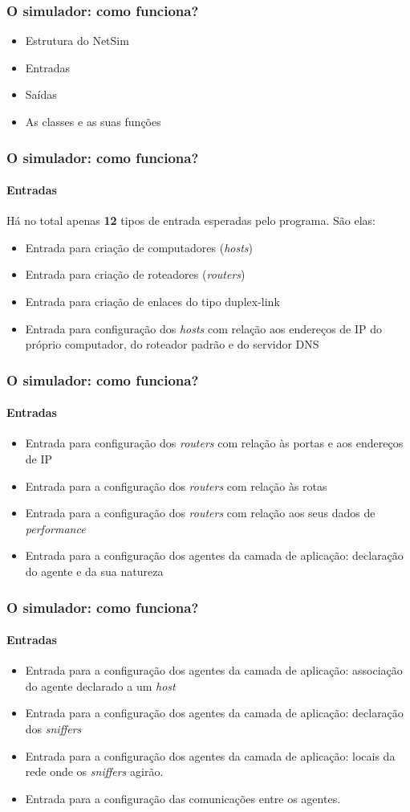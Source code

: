 \documentclass{beamer}
\begin{document}
\begin{frame}
	\frametitle{O simulador: como funciona?}
	\begin{itemize}
		\item \textcolor{covered}{Estrutura do NetSim}
		\item Entradas
		\item Saídas
		\item As classes e as suas funções
	\end{itemize}
\end{frame}

\begin{frame}
	\frametitle{O simulador: como funciona?}
	\framesubtitle{Entradas}
	Há no total apenas \textbf{12} tipos de entrada esperadas pelo programa. São elas:
	\begin{itemize}
		\item Entrada para criação de computadores (\textit{hosts})
		\item Entrada para criação de roteadores (\textit{routers})
		\item Entrada para criação de enlaces do tipo duplex-link
		\item Entrada para configuração dos \textit{hosts} com relação aos endereços de IP do próprio computador, do roteador padrão e do servidor DNS
	\end{itemize}
\end{frame}

\begin{frame}
	\frametitle{O simulador: como funciona?}
	\framesubtitle{Entradas}
	\begin{itemize}
		\item Entrada para configuração dos \textit{routers} com relação às portas e aos endereços de IP
		\item Entrada para a configuração dos \textit{routers} com relação às rotas
		\item Entrada para a configuração dos \textit{routers} com relação aos seus dados de \textit{performance}
		\item Entrada para a configuração dos agentes da camada de aplicação: declaração do agente e da sua natureza 
	\end{itemize}
\end{frame}

\begin{frame}
	\frametitle{O simulador: como funciona?}
	\framesubtitle{Entradas}
	\begin{itemize}
		\item Entrada para a configuração dos agentes da camada de aplicação: associação do agente declarado a um \textit{host}
		\item Entrada para a configuração dos agentes da camada de aplicação: declaração dos \textit{sniffers}
		\item Entrada para a configuração dos agentes da camada de aplicação: locais da rede onde os \textit{sniffers} agirão.
		\item Entrada para a configuração das comunicações entre os agentes.
	\end{itemize}
\end{frame}
\end{document}
